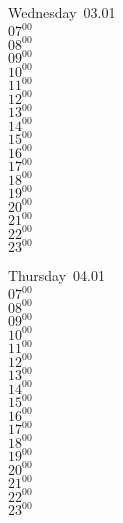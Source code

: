 \documentclass[11pt, a4paper]{book}\usepackage[]{graphicx}\usepackage[]{color}
\begin{document}
\begin{weekdaybox}
  Wednesday~03.01\\
  { 
  \vfill
  $07^{00}$\\
$08^{00}$\\
$09^{00}$\\
$10^{00}$\\
$11^{00}$\\
$12^{00}$\\
$13^{00}$\\
$14^{00}$\\
$15^{00}$\\
$16^{00}$\\
$17^{00}$\\
$18^{00}$\\
$19^{00}$\\
$20^{00}$\\
$21^{00}$\\
$22^{00}$\\
$23^{00}$\\
  }
\end{weekdaybox}
\clearpage
\begin{headerbox}
\end{headerbox}
\begin{weekdaybox}
  Thursday~04.01\\
  { 
  \vfill
  $07^{00}$\\
$08^{00}$\\
$09^{00}$\\
$10^{00}$\\
$11^{00}$\\
$12^{00}$\\
$13^{00}$\\
$14^{00}$\\
$15^{00}$\\
$16^{00}$\\
$17^{00}$\\
$18^{00}$\\
$19^{00}$\\
$20^{00}$\\
$21^{00}$\\
$22^{00}$\\
$23^{00}$\\
  }
\end{weekdaybox} 
\end{document}
